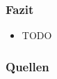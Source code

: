 \documentclass{beamer}
\begin{document}
	\begin{frame}
		\frametitle{Fazit}
		
		\begin{itemize}
			\item TODO %
		\end{itemize}
	\end{frame}
	
	
	
	\begin{frame}
		\frametitle{Quellen}
						
		
		
	\end{frame}
	
\end{document}
